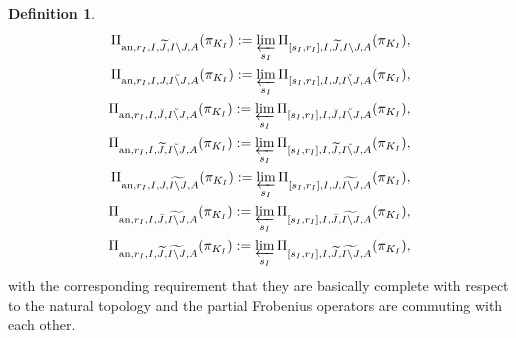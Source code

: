 \documentclass[12pt]{amsart}
\theoremstyle{definition}
\newtheorem{definition}[theorem]{Definition}
\numberwithin{equation}{section}
\begin{document}
\begin{definition}
\begin{align}
\Pi_{\mathrm{an},r_I,I,\widetilde{J},I\backslash J,A}(\pi_{K_I}):=\varprojlim_{s_I} \Pi_{[s_I,r_I],I,\widetilde{J},I\backslash J,A}(\pi_{K_I}),\\
\Pi_{\mathrm{an},r_I,I,J,\breve{I\backslash J},A}(\pi_{K_I}):=\varprojlim_{s_I}\Pi_{[s_I,r_I],I,J,\breve{I\backslash J},A}(\pi_{K_I}),\\	
\Pi_{\mathrm{an},r_I,I,\breve{J},\breve{I\backslash J},A}(\pi_{K_I}):=\varprojlim_{s_I} \Pi_{[s_I,r_I],I,\breve{J},\breve{I\backslash J},A}(\pi_{K_I}),\\	
\Pi_{\mathrm{an},r_I,I,\widetilde{J},\breve{I\backslash J},A}(\pi_{K_I}):=\varprojlim_{s_I} \Pi_{[s_I,r_I],I,\widetilde{J},\breve{I\backslash J},A}(\pi_{K_I}),\\
\Pi_{\mathrm{an},r_I,I,J,\widetilde{I\backslash J},A}(\pi_{K_I}):=\varprojlim_{s_I} \Pi_{[s_I,r_I],I,J,\widetilde{I\backslash J},A}(\pi_{K_I}),\\	
\Pi_{\mathrm{an},r_I,I,\breve{J},\widetilde{I\backslash J},A}(\pi_{K_I}):=\varprojlim_{s_I} \Pi_{[s_I,r_I],I,\breve{J},\widetilde{I\backslash J},A}(\pi_{K_I}),\\	
\Pi_{\mathrm{an},r_I,I,\widetilde{J},\widetilde{I\backslash J},A}(\pi_{K_I}):=\varprojlim_{s_I} \Pi_{[s_I,r_I],I,\widetilde{J},\widetilde{I\backslash J},A}(\pi_{K_I}),	
\end{align}
with the corresponding requirement that they are basically complete with respect to the natural topology and the partial Frobenius operators are commuting with each other.


\end{definition}
\end{document}
